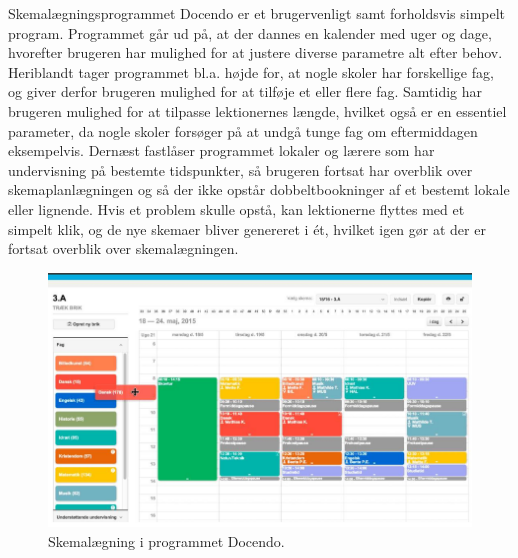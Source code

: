 Skemalægningsprogrammet Docendo er et brugervenligt samt forholdsvis simpelt program. Programmet går ud på, at der dannes en kalender med uger og dage, hvorefter brugeren har mulighed for at justere diverse parametre alt efter behov. Heriblandt tager programmet bl.a. højde for, at nogle skoler har forskellige fag, og giver derfor brugeren mulighed for at tilføje et eller flere fag. Samtidig har brugeren mulighed for at tilpasse lektionernes længde, hvilket også er en essentiel parameter, da nogle skoler forsøger på at undgå tunge fag om eftermiddagen eksempelvis. Dernæst fastlåser programmet lokaler og lærere som har undervisning på bestemte tidspunkter, så brugeren fortsat har overblik over skemaplanlægningen og så der ikke opstår dobbeltbookninger af et bestemt lokale eller lignende. Hvis et problem skulle opstå, kan lektionerne flyttes med et simpelt klik, og de nye skemaer bliver genereret i ét, hvilket igen gør at der er fortsat overblik over skemalægningen\cite{docendo}.
\begin{figure}[h]
  \centering
  \includegraphics[scale = 0.9]{partials/graphics/docendo.png}
  \caption{Skemalægning i programmet Docendo\cite{docendo}.}
  \label{fig:docendo}
\end{figure}
